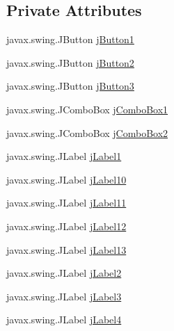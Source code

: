 \subsection*{Private Attributes}
\begin{DoxyCompactItemize}
\item 
javax.\+swing.\+J\+Button \mbox{\hyperlink{class_interfaz_package_1_1_verificar_libro_a5795c2ef06a892f54b964cccdaa87bac}{j\+Button1}}
\item 
javax.\+swing.\+J\+Button \mbox{\hyperlink{class_interfaz_package_1_1_verificar_libro_a35a502b6b4c12dee0f50c5409271d275}{j\+Button2}}
\item 
javax.\+swing.\+J\+Button \mbox{\hyperlink{class_interfaz_package_1_1_verificar_libro_a71325c9a930cd968c2b6ce4abc7e8129}{j\+Button3}}
\item 
javax.\+swing.\+J\+Combo\+Box \mbox{\hyperlink{class_interfaz_package_1_1_verificar_libro_a5f8fd3453828fec1a8baafb3788ee5c6}{j\+Combo\+Box1}}
\item 
javax.\+swing.\+J\+Combo\+Box \mbox{\hyperlink{class_interfaz_package_1_1_verificar_libro_a6e3256102994e7764c50c7a37aebc859}{j\+Combo\+Box2}}
\item 
javax.\+swing.\+J\+Label \mbox{\hyperlink{class_interfaz_package_1_1_verificar_libro_ae036e1136fd3ea0a459815b6fbad2974}{j\+Label1}}
\item 
javax.\+swing.\+J\+Label \mbox{\hyperlink{class_interfaz_package_1_1_verificar_libro_a5107c81876e9d94ddd9d39f3c2102814}{j\+Label10}}
\item 
javax.\+swing.\+J\+Label \mbox{\hyperlink{class_interfaz_package_1_1_verificar_libro_af2c91db62099138d0bffd934b6e470ed}{j\+Label11}}
\item 
javax.\+swing.\+J\+Label \mbox{\hyperlink{class_interfaz_package_1_1_verificar_libro_abc6a3ed061a0f7f051470750826cda02}{j\+Label12}}
\item 
javax.\+swing.\+J\+Label \mbox{\hyperlink{class_interfaz_package_1_1_verificar_libro_a46332053f952c0ec6ca5dc7b744e135d}{j\+Label13}}
\item 
javax.\+swing.\+J\+Label \mbox{\hyperlink{class_interfaz_package_1_1_verificar_libro_ae1649adac4d57368e1c269c7dfa7ea8e}{j\+Label2}}
\item 
javax.\+swing.\+J\+Label \mbox{\hyperlink{class_interfaz_package_1_1_verificar_libro_a07f26adefc6f29a9f6335d4eceac2a96}{j\+Label3}}
\item 
javax.\+swing.\+J\+Label \mbox{\hyperlink{class_interfaz_package_1_1_verificar_libro_a3df20770732e9526771c5a14aa5afb6a}{j\+Label4}}

\end{DoxyCompactItemize}
